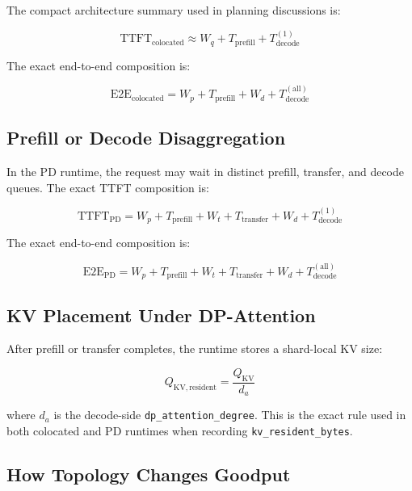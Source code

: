 The compact architecture summary used in planning discussions is:

\begin{equation*}
\mathrm{TTFT}_{\mathrm{colocated}} \approx
W_q + T_{\mathrm{prefill}} + T_{\mathrm{decode}}^{(1)}
\end{equation*}

The exact end-to-end composition is:

\begin{equation*}
\mathrm{E2E}_{\mathrm{colocated}} =
W_p + T_{\mathrm{prefill}} + W_d + T_{\mathrm{decode}}^{(\mathrm{all})}
\end{equation*}

\subsection{Prefill or Decode Disaggregation}

In the PD runtime, the request may wait in distinct prefill, transfer, and
decode queues. The exact TTFT composition is:

\begin{equation*}
\mathrm{TTFT}_{\mathrm{PD}} =
W_p + T_{\mathrm{prefill}} +
W_t + T_{\mathrm{transfer}} +
W_d + T_{\mathrm{decode}}^{(1)}
\end{equation*}

The exact end-to-end composition is:

\begin{equation*}
\mathrm{E2E}_{\mathrm{PD}} =
W_p + T_{\mathrm{prefill}} +
W_t + T_{\mathrm{transfer}} +
W_d + T_{\mathrm{decode}}^{(\mathrm{all})}
\end{equation*}

\subsection{KV Placement Under DP-Attention}

After prefill or transfer completes, the runtime stores a shard-local KV size:

\begin{equation*}
Q_{\mathrm{KV,resident}} =
\frac{Q_{\mathrm{KV}}}{d_a}
\end{equation*}

where \(d_a\) is the decode-side \texttt{dp\_attention\_degree}. This is the
exact rule used in both colocated and PD runtimes when recording
\texttt{kv\_resident\_bytes}.

\subsection{How Topology Changes Goodput}

